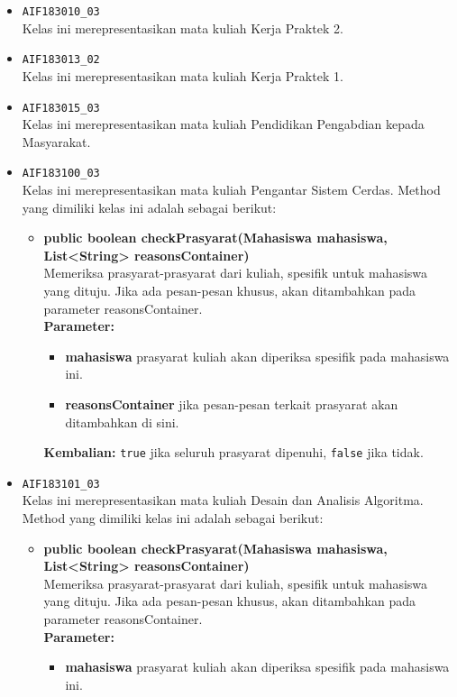 \begin{enumerate}
\begin{itemize}
		\item \texttt{AIF183010\_03} \\
		Kelas ini merepresentasikan mata kuliah Kerja Praktek 2.
		\item \texttt{AIF183013\_02} \\
		Kelas ini merepresentasikan mata kuliah Kerja Praktek 1.
		\item \texttt{AIF183015\_03} \\
		Kelas ini merepresentasikan mata kuliah Pendidikan Pengabdian kepada Masyarakat.
		\item \texttt{AIF183100\_03} \\
		Kelas ini merepresentasikan mata kuliah Pengantar Sistem Cerdas. Method yang dimiliki kelas ini adalah sebagai berikut: 
		\begin{itemize}
			\item \textbf{public boolean checkPrasyarat(Mahasiswa mahasiswa, List<String> reasonsContainer)}\\
			Memeriksa prasyarat-prasyarat dari kuliah, spesifik untuk mahasiswa yang dituju. Jika ada pesan-pesan khusus, akan ditambahkan pada parameter reasonsContainer.\\
			\textbf{Parameter:}
			\begin{itemize}
				\item \textbf{mahasiswa} prasyarat kuliah akan diperiksa spesifik pada mahasiswa ini.
				\item \textbf{reasonsContainer} jika pesan-pesan terkait prasyarat akan ditambahkan di sini.
			\end{itemize}
			\textbf{Kembalian:} \texttt{true} jika seluruh prasyarat dipenuhi, \texttt{false} jika tidak.
		\end{itemize}
		\item \texttt{AIF183101\_03} \\
		Kelas ini merepresentasikan mata kuliah Desain dan Analisis Algoritma. Method yang dimiliki kelas ini adalah sebagai berikut: 
		\begin{itemize}
			\item \textbf{public boolean checkPrasyarat(Mahasiswa mahasiswa, List<String> reasonsContainer)}\\
			Memeriksa prasyarat-prasyarat dari kuliah, spesifik untuk mahasiswa yang dituju. Jika ada pesan-pesan khusus, akan ditambahkan pada parameter reasonsContainer.\\
			\textbf{Parameter:}
			\begin{itemize}
				\item \textbf{mahasiswa} prasyarat kuliah akan diperiksa spesifik pada mahasiswa ini.

\end{itemize}
\end{itemize}
\end{itemize}
\end{enumerate}

